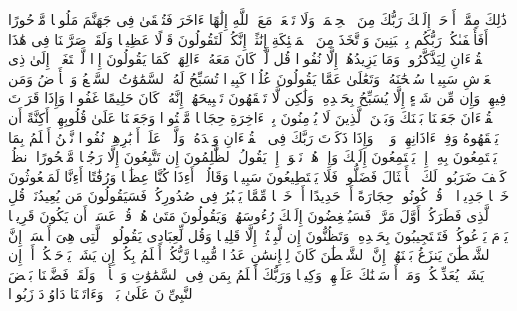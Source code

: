 \startbuffer[\q:17:39]
ذَٰلِكَ مِمَّاۤ أَوۡحَىٰۤ إِلَیۡكَ رَبُّكَ مِنَ ٱلۡحِكۡمَةِۗ وَلَا تَجۡعَلۡ مَعَ ٱللَّهِ إِلَٰهًا ءَاخَرَ فَتُلۡقَىٰ فِی جَهَنَّمَ مَلُومࣰا مَّدۡحُورًا%
\stopbuffer
\startbuffer[\q:17:40]
أَفَأَصۡفَىٰكُمۡ رَبُّكُم بِٱلۡبَنِینَ وَٱتَّخَذَ مِنَ ٱلۡمَلَٰۤئِكَةِ إِنَٰثًاۚ إِنَّكُمۡ لَتَقُولُونَ قَوۡلًا عَظِیمࣰا%
\stopbuffer
\startbuffer[\q:17:41]
وَلَقَدۡ صَرَّفۡنَا فِی هَٰذَا ٱلۡقُرۡءَانِ لِیَذَّكَّرُوا۟ وَمَا یَزِیدُهُمۡ إِلَّا نُفُورࣰا%
\stopbuffer
\startbuffer[\q:17:42]
قُل لَّوۡ كَانَ مَعَهُۥۤ ءَالِهَةࣱ كَمَا یَقُولُونَ إِذࣰا لَّٱبۡتَغَوۡا۟ إِلَىٰ ذِی ٱلۡعَرۡشِ سَبِیلࣰا%
\stopbuffer
\startbuffer[\q:17:43]
سُبۡحَٰنَهُۥ وَتَعَٰلَىٰ عَمَّا یَقُولُونَ عُلُوࣰّا كَبِیرࣰا%
\stopbuffer
\startbuffer[\q:17:44]
تُسَبِّحُ لَهُ ٱلسَّمَٰوَٰتُ ٱلسَّبۡعُ وَٱلۡأَرۡضُ وَمَن فِیهِنَّۚ وَإِن مِّن شَیۡءٍ إِلَّا یُسَبِّحُ بِحَمۡدِهِۦ وَلَٰكِن لَّا تَفۡقَهُونَ تَسۡبِیحَهُمۡۚ إِنَّهُۥ كَانَ حَلِیمًا غَفُورࣰا%
\stopbuffer
\startbuffer[\q:17:45]
وَإِذَا قَرَأۡتَ ٱلۡقُرۡءَانَ جَعَلۡنَا بَیۡنَكَ وَبَیۡنَ ٱلَّذِینَ لَا یُؤۡمِنُونَ بِٱلۡءَاخِرَةِ حِجَابࣰا مَّسۡتُورࣰا%
\stopbuffer
\startbuffer[\q:17:46]
وَجَعَلۡنَا عَلَىٰ قُلُوبِهِمۡ أَكِنَّةً أَن یَفۡقَهُوهُ وَفِیۤ ءَاذَانِهِمۡ وَقۡرࣰاۚ وَإِذَا ذَكَرۡتَ رَبَّكَ فِی ٱلۡقُرۡءَانِ وَحۡدَهُۥ وَلَّوۡا۟ عَلَىٰۤ أَدۡبَٰرِهِمۡ نُفُورࣰا%
\stopbuffer
\startbuffer[\q:17:47]
نَّحۡنُ أَعۡلَمُ بِمَا یَسۡتَمِعُونَ بِهِۦۤ إِذۡ یَسۡتَمِعُونَ إِلَیۡكَ وَإِذۡ هُمۡ نَجۡوَىٰۤ إِذۡ یَقُولُ ٱلظَّٰلِمُونَ إِن تَتَّبِعُونَ إِلَّا رَجُلࣰا مَّسۡحُورًا%
\stopbuffer
\startbuffer[\q:17:48]
ٱنظُرۡ كَیۡفَ ضَرَبُوا۟ لَكَ ٱلۡأَمۡثَالَ فَضَلُّوا۟ فَلَا یَسۡتَطِیعُونَ سَبِیلࣰا%
\stopbuffer
\startbuffer[\q:17:49]
وَقَالُوۤا۟ أَءِذَا كُنَّا عِظَٰمࣰا وَرُفَٰتًا أَءِنَّا لَمَبۡعُوثُونَ خَلۡقࣰا جَدِیدࣰا%
\stopbuffer
\startbuffer[\q:17:50]
۞ قُلۡ كُونُوا۟ حِجَارَةً أَوۡ حَدِیدًا%
\stopbuffer
\startbuffer[\q:17:51]
أَوۡ خَلۡقࣰا مِّمَّا یَكۡبُرُ فِی صُدُورِكُمۡۚ فَسَیَقُولُونَ مَن یُعِیدُنَاۖ قُلِ ٱلَّذِی فَطَرَكُمۡ أَوَّلَ مَرَّةࣲۚ فَسَیُنۡغِضُونَ إِلَیۡكَ رُءُوسَهُمۡ وَیَقُولُونَ مَتَىٰ هُوَۖ قُلۡ عَسَىٰۤ أَن یَكُونَ قَرِیبࣰا%
\stopbuffer
\startbuffer[\q:17:52]
یَوۡمَ یَدۡعُوكُمۡ فَتَسۡتَجِیبُونَ بِحَمۡدِهِۦ وَتَظُنُّونَ إِن لَّبِثۡتُمۡ إِلَّا قَلِیلࣰا%
\stopbuffer
\startbuffer[\q:17:53]
وَقُل لِّعِبَادِی یَقُولُوا۟ ٱلَّتِی هِیَ أَحۡسَنُۚ إِنَّ ٱلشَّیۡطَٰنَ یَنزَغُ بَیۡنَهُمۡۚ إِنَّ ٱلشَّیۡطَٰنَ كَانَ لِلۡإِنسَٰنِ عَدُوࣰّا مُّبِینࣰا%
\stopbuffer
\startbuffer[\q:17:54]
رَّبُّكُمۡ أَعۡلَمُ بِكُمۡۖ إِن یَشَأۡ یَرۡحَمۡكُمۡ أَوۡ إِن یَشَأۡ یُعَذِّبۡكُمۡۚ وَمَاۤ أَرۡسَلۡنَٰكَ عَلَیۡهِمۡ وَكِیلࣰا%
\stopbuffer
\startbuffer[\q:17:55]
وَرَبُّكَ أَعۡلَمُ بِمَن فِی ٱلسَّمَٰوَٰتِ وَٱلۡأَرۡضِۗ وَلَقَدۡ فَضَّلۡنَا بَعۡضَ ٱلنَّبِیِّۦنَ عَلَىٰ بَعۡضࣲۖ وَءَاتَیۡنَا دَاوُۥدَ زَبُورࣰا%
